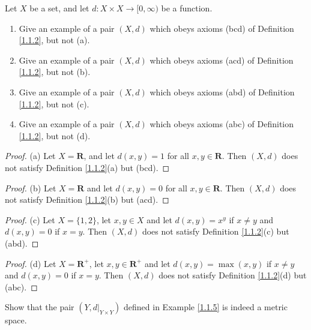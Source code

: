 \begin{exercise}\label{ex 1.1.3}
    Let \(X\) be a set, and let \(d : X \times X \to [0, \infty)\) be a function.
    \begin{enumerate}
        \item Give an example of a pair \((X, d)\) which obeys axioms (bcd) of Definition \ref{1.1.2}, but not (a).
        \item Give an example of a pair \((X, d)\) which obeys axioms (acd) of Definition \ref{1.1.2}, but not (b).
        \item Give an example of a pair \((X, d)\) which obeys axioms (abd) of Definition \ref{1.1.2}, but not (c).
        \item Give an example of a pair \((X, d)\) which obeys axioms (abc) of Definition \ref{1.1.2}, but not (d).
    \end{enumerate}
\end{exercise}

\begin{proof}{(a)}
    Let \(X = \mathbf{R}\), and let \(d(x, y) = 1\) for all \(x, y \in \mathbf{R}\).
    Then \((X, d)\) does not satisfy Definition \ref{1.1.2}(a) but (bcd).
\end{proof}

\begin{proof}{(b)}
    Let \(X = \mathbf{R}\) and let \(d(x, y) = 0\) for all \(x, y \in \mathbf{R}\).
    Then \((X, d)\) does not satisfy Definition \ref{1.1.2}(b) but (acd).
\end{proof}

\begin{proof}{(c)}
    Let \(X = \{1, 2\}\), let \(x, y \in X\) and let \(d(x, y) = x^y\) if \(x \neq y\) and \(d(x, y) = 0\) if \(x = y\).
    Then \((X, d)\) does not satisfy Definition \ref{1.1.2}(c) but (abd).
\end{proof}

\begin{proof}{(d)}
    Let \(X = \mathbf{R}^+\), let \(x, y \in \mathbf{R}^+\) and let \(d(x, y) = \max(x, y)\) if \(x \neq y\) and \(d(x, y) = 0\) if \(x = y\).
    Then \((X, d)\) does not satisfy Definition \ref{1.1.2}(d) but (abc).
\end{proof}

\begin{exercise}\label{ex 1.1.4}
    Show that the pair \((Y, d|_{Y \times Y})\) defined in Example \ref{1.1.5} is indeed a metric space.
\end{exercise}

